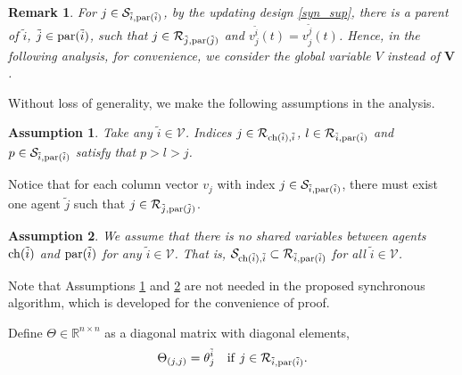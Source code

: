 \documentclass[journal]{IEEEtran}
\newtheorem{remark}{Remark}[section]
\newtheorem{assumption}{Assumption}[section]
\begin{document}
\begin{remark}
	 For $j\in \mathcal{S}_{\tilde{i},{\rm par}(\tilde{i})}$, by the updating design \eqref{syn_sup}, there is a parent of $\tilde{i}$, $\tilde{j}\in {\rm par}(\tilde{i})$, such that $j\in \mathcal{R}_{\tilde{j},{\rm par}(\tilde{j})}$ and $v_j^{\tilde{i}}(t)=v_j^{\tilde{j}}(t)$. Hence, in the following analysis, for convenience, we consider the global variable $V$ instead of $\mathbf{V}$.
\end{remark}
 \par Without loss of generality,  we make the following assumptions in the analysis.
 \begin{assumption}\label{SR_indice}
 	Take any  $\tilde{i}\in\mathcal V$. Indices
 	$j\in \mathcal{R}_{{\rm ch}(\tilde{i}),\tilde{i}}$, $l\in \mathcal{R}_{\tilde{i},{\rm par}(\tilde{i})}$ and $p\in\mathcal{S}_{\tilde{i},{\rm par}(\tilde{i})}$ satisfy that $p>l>j$.
 \end{assumption}
 
 Notice that for each column vector $v_j$ with index $j\in \mathcal{S}_{\tilde{i},{\rm par}(\tilde{i})}$, there must exist one agent $\tilde{j}$ such that $j\in \mathcal{R}_{\tilde{j},{\rm par}(\tilde{j})}$.  
\begin{assumption}\label{twoshare_assu}
	 We assume that there is no shared variables between agents ${\rm ch}(\tilde{i})$ and ${\rm par}(\tilde{i})$ for any $\tilde{i}\in\mathcal V$. That is,
 $\mathcal{S}_{{\rm ch}(\tilde{i}),\tilde{i}}\subset \mathcal{R}_{\tilde{i},{\rm par}(\tilde{i})}$ for all $\tilde{i}\in\mathcal V$.
\end{assumption}
\par Note that Assumptions \ref{SR_indice} and \ref{twoshare_assu} are not needed in the proposed synchronous algorithm, which is developed for the convenience of proof. 

\par Define $\Theta\in\mathbb{R}^{n\times n}$ as a diagonal matrix with diagonal elements,
\begin{align}\label{dia_theta}
\Theta_{(j,j)}=\theta_j^{\tilde{i}} \quad {\rm if} \ j\in \mathcal{R}_{\tilde{i},{\rm par}(\tilde{i})}.
\end{align}
\end{document}
